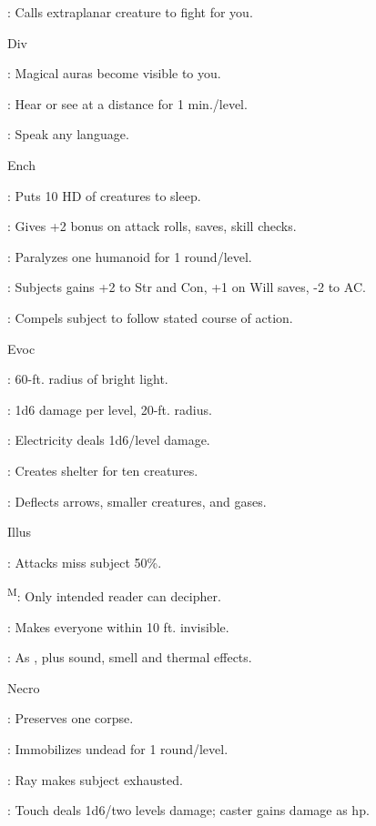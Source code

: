 : Calls extraplanar creature to fight for you.

Div

: Magical auras become visible to you.

: Hear or see at a distance for 1 min./level.

: Speak any language.

Ench

: Puts 10 HD of creatures to sleep.

: Gives +2 bonus on attack rolls, saves, skill checks.

: Paralyzes one humanoid for 1 round/level.

: Subjects gains +2 to Str and Con, +1 on Will saves, -2 to AC.

: Compels subject to follow stated course of action.

Evoc

: 60-ft. radius of bright light.

: 1d6 damage per level, 20-ft. radius.

: Electricity deals 1d6/level damage.

: Creates shelter for ten creatures.

: Deflects arrows, smaller creatures, and gases.

Illus

: Attacks miss subject 50\%.

\textsuperscript{M}: Only intended reader can decipher.

: Makes everyone within 10 ft. invisible.

: As , plus sound, smell and thermal effects.

Necro

: Preserves one corpse.

: Immobilizes undead for 1 round/level.

: Ray makes subject exhausted.

: Touch deals 1d6/two levels damage; caster gains damage as hp.

